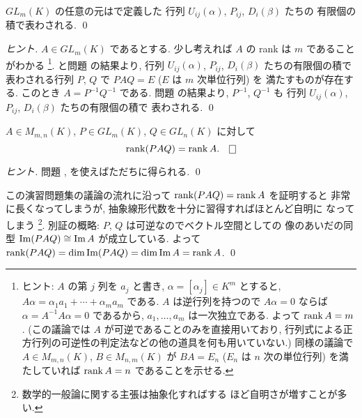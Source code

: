 \documentclass[12pt,twoside]{jarticle}
\begin{document}
\begin{question}[一般線形群の生成元]
  \label{q:gen-GL}
  $GL_m(K)$ の任意の元はで定義した
  行列 $U_{ij}(\alpha)$, $P_{ij}$, $D_i(\beta)$ たちの
  有限個の積で表わされる. \qed
\end{question}

\begin{proof}[ヒント]
  $A\in GL_m(K)$ であるとする.
  少し考えれば $A$ の rank は $m$ であることがわかる%
  \footnote{ヒント: $A$ の第 $j$ 列を $a_j$ と書き, $\alpha=[\alpha_j]\in K^m$ 
    とすると, $A\alpha = \alpha_1 a_1 + \cdots + \alpha_m a_m$ である.
    $A$ は逆行列を持つので $A\alpha = 0$ ならば $\alpha = A^{-1}A\alpha = 0$
    であるから, $a_1,\ldots,a_m$ は一次独立である. よって $\mathop{\mathrm{rank}}\nolimits A=m$.
    (この議論では $A$ が可逆であることのみを直接用いており, 
    行列式による正方行列の可逆性の判定法などの他の道具を何も用いていない.)
    同様の議論で $A\in M_{m,n}(K)$, $B\in M_{n,m}(K)$ が $BA=E_n$ ($E_n$ 
    は $n$ 次の単位行列) を満たしていれば $\mathop{\mathrm{rank}}\nolimits A=n$ であることを示せる.}.
  と問題  の結果より, 
  行列 $U_{ij}(\alpha)$, $P_{ij}$, $D_i(\beta)$ たちの有限個の積で
  表わされる行列 $P$, $Q$ で $PAQ=E$ ($E$ は $m$ 次単位行列) を
  満たすものが存在する. このとき $A=P^{-1}Q^{-1}$ である.
  問題  の結果より, $P^{-1}$, $Q^{-1}$ も
  行列 $U_{ij}(\alpha)$, $P_{ij}$, $D_i(\beta)$ たちの有限個の積で
  表わされる. 
  \qed
\end{proof}


\begin{question}
  $A\in M_{m,n}(K)$, $P\in GL_m(K)$, $Q\in GL_n(K)$ に対して
  \begin{equation*}
    \rank(PAQ) = \rank A.
    \qed
  \end{equation*}
\end{question}

\begin{proof}[ヒント]
  問題 ,  を使えばただちに得られる. \qed
\end{proof}

\begin{guide}
  この演習問題集の議論の流れに沿って $\mathop{\mathrm{rank}}\nolimits(PAQ) = \mathop{\mathrm{rank}}\nolimits A$ を証明すると
  非常に長くなってしまうが, 抽象線形代数を十分に習得すればほとんど自明に
  なってしまう%
  \footnote{数学的一般論に関する主張は抽象化すればする
    ほど自明さが増すことが多い.}.
  別証の概略: $P$, $Q$ は可逆なのでベクトル空間としての
  像のあいだの同型 $\mathop{\mathrm{Im}}\nolimits(PAQ)\cong\mathop{\mathrm{Im}}\nolimits A$ が成立している.
  よって $\mathop{\mathrm{rank}}\nolimits(PAQ) = \dim\mathop{\mathrm{Im}}\nolimits(PAQ) = \dim\mathop{\mathrm{Im}}\nolimits A = \mathop{\mathrm{rank}}\nolimits A$.
  \qed
\end{guide}
\end{document}
